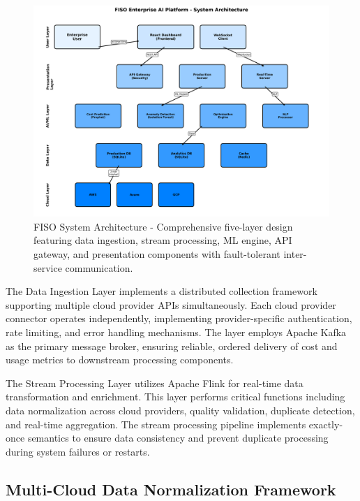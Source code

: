 \documentclass[conference]{IEEEtran}
\begin{document}
\begin{figure}[h]
    \centering
    \begin{mdframed}[style=imagestyle]
        \includegraphics[width=\columnwidth]{docs/images/system_architecture.png}
    \end{mdframed}
    \caption{FISO System Architecture - Comprehensive five-layer design featuring data ingestion, stream processing, ML engine, API gateway, and presentation components with fault-tolerant inter-service communication.}
    \label{fig:architecture}
\end{figure}

The Data Ingestion Layer implements a distributed collection framework supporting multiple cloud provider APIs simultaneously. Each cloud provider connector operates independently, implementing provider-specific authentication, rate limiting, and error handling mechanisms. The layer employs Apache Kafka as the primary message broker, ensuring reliable, ordered delivery of cost and usage metrics to downstream processing components.

The Stream Processing Layer utilizes Apache Flink for real-time data transformation and enrichment. This layer performs critical functions including data normalization across cloud providers, quality validation, duplicate detection, and real-time aggregation. The stream processing pipeline implements exactly-once semantics to ensure data consistency and prevent duplicate processing during system failures or restarts.

\subsection{Multi-Cloud Data Normalization Framework}
\end{document}
